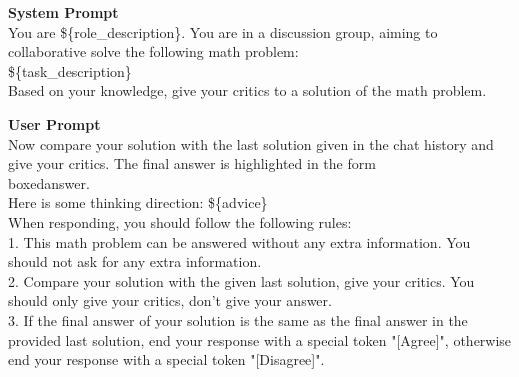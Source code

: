 \begin{tcolorbox}[
  title=Problem Solver 2 Prompts,
  breakable,
  colback=white,
  colframe=black
]

\textbf{System Prompt} \\
You are \$\{role\_description\}. You are in a discussion group, aiming to collaborative solve the following math problem: \\
\$\{task\_description\} \\

Based on your knowledge, give your critics to a solution of the math problem.

\textbf{User Prompt} \\
Now compare your solution with the last solution given in the chat history and give your critics. The final answer is highlighted in the form \\boxed{answer}. \\
Here is some thinking direction: \$\{advice\} \\
When responding, you should follow the following rules: \\
1. This math problem can be answered without any extra information. You should not ask for any extra information. \\
2. Compare your solution with the given last solution, give your critics. You should only give your critics, don't give your answer. \\
3. If the final answer of your solution is the same as the final answer in the provided last solution, end your response with a special token "[Agree]", otherwise end your response with a special token "[Disagree]". \\

\end{tcolorbox}




